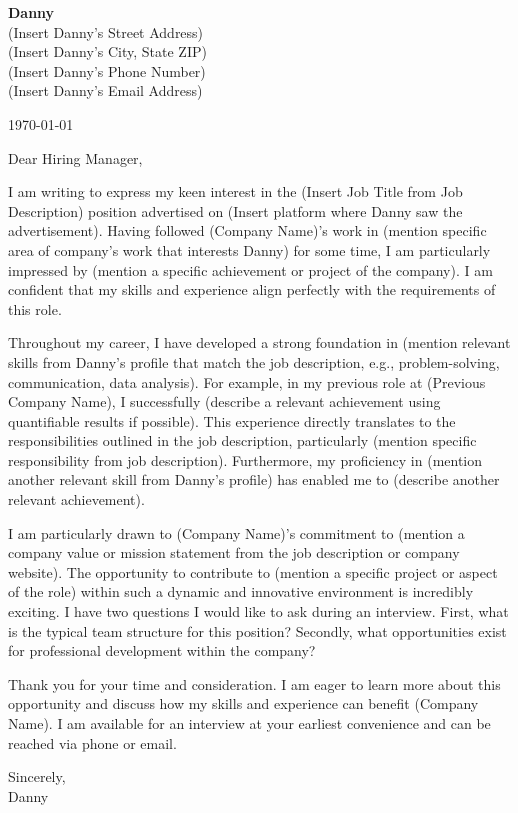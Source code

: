 \documentclass[letterpaper,11pt]{article}
\begin{document}
\textbf{Danny} \\
(Insert Danny's Street Address) \\
(Insert Danny's City, State ZIP) \\
(Insert Danny's Phone Number) \\
(Insert Danny's Email Address) \\
\vspace{20pt}

\today \\
\vspace{20pt}

Dear Hiring Manager, \\
\vspace{10pt}

I am writing to express my keen interest in the (Insert Job Title from Job Description) position advertised on (Insert platform where Danny saw the advertisement).  Having followed (Company Name)'s work in (mention specific area of company's work that interests Danny) for some time, I am particularly impressed by (mention a specific achievement or project of the company).  I am confident that my skills and experience align perfectly with the requirements of this role.


\vspace{10pt}

Throughout my career, I have developed a strong foundation in (mention relevant skills from Danny's profile that match the job description, e.g., problem-solving, communication, data analysis). For example, in my previous role at (Previous Company Name), I successfully (describe a relevant achievement using quantifiable results if possible). This experience directly translates to the responsibilities outlined in the job description, particularly (mention specific responsibility from job description).  Furthermore, my proficiency in (mention another relevant skill from Danny's profile) has enabled me to (describe another relevant achievement).


\vspace{10pt}

I am particularly drawn to (Company Name)'s commitment to (mention a company value or mission statement from the job description or company website).  The opportunity to contribute to (mention a specific project or aspect of the role) within such a dynamic and innovative environment is incredibly exciting. I have two questions I would like to ask during an interview. First, what is the typical team structure for this position? Secondly, what opportunities exist for professional development within the company?


\vspace{10pt}

Thank you for your time and consideration. I am eager to learn more about this opportunity and discuss how my skills and experience can benefit (Company Name). I am available for an interview at your earliest convenience and can be reached via phone or email.


\vspace{20pt}

Sincerely, \\
\vspace{40pt}
Danny
\end{document}
